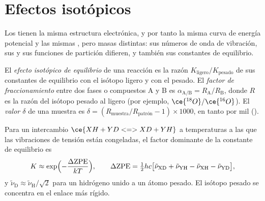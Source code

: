 \section{Efectos isotópicos}

Los  tienen la misma estructura electrónica, y por tanto la misma curva de energía
potencial y las mismas , pero masas distintas: sus números de onda de
vibración, sus  y sus funciones de partición difieren, y también
sus constantes de equilibrio.

\begin{definition}\label{def:b3:statistical-thermo-applied:isotope-effect}
El \emph{efecto isotópico de equilibrio} de una
reacción es la razón $K_{\mathrm{ligero}}/K_{\mathrm{pesado}}$ de sus constantes de equilibrio con el
isótopo ligero y con el pesado. El \emph{factor de fraccionamiento}
entre dos fases o compuestos A y B es $\alpha_{\mathrm{A/B}} = R_{\mathrm A}/R_{\mathrm B}$, donde
$R$ es la razón del isótopo pesado al ligero (por ejemplo, $\ce{^{18}O}/\ce{^{16}O}$). El
\emph{valor $\delta$} de una muestra es $\delta = (R_{\mathrm{muestra}}/R_{\text{patrón}}
- 1) \times 1000$, en tanto por mil (\textperthousand).
\end{definition}

\begin{proposition}\label{prop:b3:statistical-thermo-applied:zpe-isotope}
Para un intercambio $\ce{XH + YD <=> XD + YH}$ a temperaturas a las que las vibraciones de
tensión están congeladas, el factor dominante de la constante de equilibrio es
\[
  K \approx \exp\Bigl(-\frac{\Delta\mathrm{ZPE}}{kT}\Bigr), \qquad
  \Delta\mathrm{ZPE} = \tfrac12hc\bigl[\tilde\nu_{\mathrm{XD}} + \tilde\nu_{\mathrm{YH}} - \tilde\nu_{\mathrm{XH}} - \tilde\nu_{\mathrm{YD}}\bigr],
\]
y $\tilde\nu_{\mathrm D} \approx \tilde\nu_{\mathrm H}/\sqrt2$ para un hidrógeno unido a un átomo pesado. El isótopo
pesado se concentra en el enlace más rígido.
\end{proposition}

